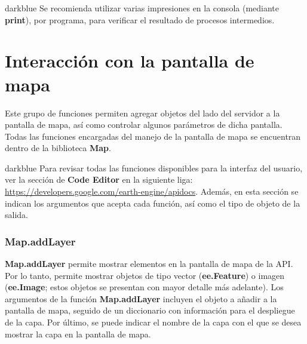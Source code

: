 \documentclass[
  12pt,
  letterpaper,
  twoside]{book}
\newcommand\boldpurple[1]{\textcolor{darkpurple}{\textbf{#1}}}
\begin{document}
\begin{bluebox2}

\begin{awesomeblock}{5pt}{\faLightbulb}{darkblue}
Se recomienda utilizar varias impresiones en la consola (mediante \boldpurple{print}), por programa, para verificar el resultado de procesos intermedios.

\end{awesomeblock}

\end{bluebox2}

\hypertarget{interacciuxf3n-con-la-pantalla-de-mapa}{%
\section{Interacción con la pantalla de mapa}\label{interacciuxf3n-con-la-pantalla-de-mapa}}

Este grupo de funciones permiten agregar objetos del lado del servidor a la pantalla de mapa, así como controlar algunos parámetros de dicha pantalla. Todas las funciones encargadas del manejo de la pantalla de mapa se encuentran dentro de la biblioteca \boldpurple{Map}.

\begin{bluebox2}

\begin{awesomeblock}{5pt}{\faLightbulb}{darkblue}
Para revisar todas las funciones disponibles para la interfaz del usuario, ver la sección de \textbf{Code Editor} en la siguiente liga: \url{https://developers.google.com/earth-engine/apidocs}. Además, en esta sección se indican los argumentos que acepta cada función, así como el tipo de objeto de la salida.

\end{awesomeblock}

\end{bluebox2}

\hypertarget{map.addlayer}{%
\subsubsection*{Map.addLayer}\label{map.addlayer}}

\boldpurple{Map.addLayer} permite mostrar elementos en la pantalla de mapa de la API. Por lo tanto, permite mostrar objetos de tipo vector (\boldpurple{ee.Feature}) o imagen (\boldpurple{ee.Image}; estos objetos se presentan con mayor detalle más adelante). Los argumentos de la función \boldpurple{Map.addLayer} incluyen el objeto a añadir a la pantalla de mapa, seguido de un diccionario con información para el despliegue de la capa. Por último, se puede indicar el nombre de la capa con el que se desea mostrar la capa en la pantalla de mapa.
\end{document}
